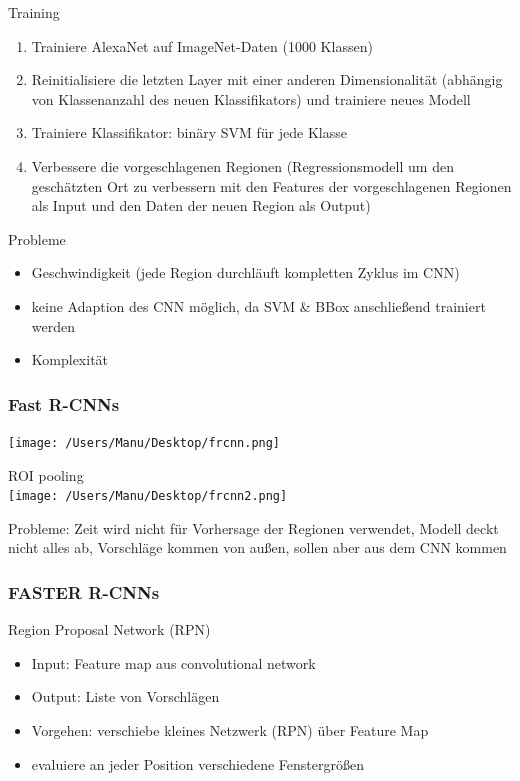 \documentclass[paper=a4, fontsize=11pt]{scrartcl} %
\numberwithin{equation}{section} %
\numberwithin{figure}{section} %
\numberwithin{table}{section} %
\begin{document}
Training
\begin{enumerate}
\item Trainiere AlexaNet auf ImageNet-Daten (1000 Klassen)
\item Reinitialisiere die letzten Layer mit einer anderen Dimensionalität (abhängig von Klassenanzahl des neuen Klassifikators) und trainiere neues Modell
\item Trainiere Klassifikator: binäry SVM für jede Klasse
\item Verbessere die vorgeschlagenen Regionen (Regressionsmodell um den geschätzten Ort zu verbessern mit den Features der vorgeschlagenen Regionen als Input und den Daten der neuen Region als Output)
\end{enumerate}

Probleme
\begin{itemize}
\item Geschwindigkeit (jede Region durchläuft kompletten Zyklus im CNN)
\item keine Adaption des CNN möglich, da SVM \& BBox anschließend trainiert werden
\item Komplexität
\end{itemize}

\subsubsection{Fast R-CNNs} 

\texttt{[image: /Users/Manu/Desktop/frcnn.png]}

ROI pooling\\ 
\texttt{[image: /Users/Manu/Desktop/frcnn2.png]}

Probleme: Zeit wird nicht für Vorhersage der Regionen verwendet, Modell deckt nicht alles ab, Vorschläge kommen von außen, sollen aber aus dem CNN kommen

\subsubsection{FASTER R-CNNs}

Region Proposal Network (RPN)

\begin{itemize}
\item Input: Feature map aus convolutional network
\item Output: Liste von Vorschlägen
\item Vorgehen: verschiebe kleines Netzwerk (RPN) über Feature Map
\item evaluiere an jeder Position verschiedene Fenstergrößen
\end{itemize}
\end{document}
